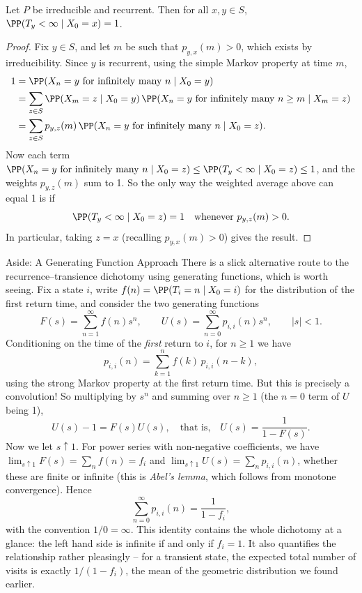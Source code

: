 \begin{theorem}
	Let $P$ be irreducible and recurrent. Then for all $x, y \in S$, $\PP(T_y < \infty \mid X_0 = x) = 1$.
\end{theorem}
\begin{proof}
	Fix $y \in S$, and let $m$ be such that $p_{y, x}(m) > 0$, which exists by irreducibility. Since $y$ is recurrent, using the simple Markov property at time $m$,
	\begin{align*}
		1 &= \PP(X_n = y \text{ for infinitely many } n \mid X_0 = y) \\
		&= \sum_{z \in S} \PP(X_m = z \mid X_0 = y) \, \PP(X_n = y \text{ for infinitely many } n \geq m \mid X_m = z) \\
		&= \sum_{z \in S} p_{y, z}(m) \, \PP(X_n = y \text{ for infinitely many } n \mid X_0 = z).
	\end{align*}
	Now each term $\PP(X_n = y \text{ for infinitely many } n \mid X_0 = z) \leq \PP(T_y < \infty \mid X_0 = z) \leq 1$, and the weights $p_{y, z}(m)$ sum to 1. So the only way the weighted average above can equal 1 is if
	$$
	\PP(T_y < \infty \mid X_0 = z) = 1 \quad \text{whenever } p_{y, z}(m) > 0.
	$$
	In particular, taking $z = x$ (recalling $p_{y,x}(m) > 0$) gives the result.
\end{proof}

\begin{aside}{Aside: A Generating Function Approach}
	There is a slick alternative route to the recurrence--transience dichotomy using generating functions, which is worth seeing. Fix a state $i$, write $f(n) = \PP(T_i = n \mid X_0 = i)$ for the distribution of the first return time, and consider the two generating functions
	$$
	F(s) = \sum_{n = 1}^{\infty} f(n)s^n, \qquad U(s) = \sum_{n = 0}^{\infty} p_{i, i}(n) s^n, \qquad |s| < 1.
	$$
	Conditioning on the time of the \emph{first} return to $i$, for $n \geq 1$ we have
	$$
	p_{i, i}(n) = \sum_{k = 1}^{n} f(k)\, p_{i, i}(n - k),
	$$
	using the strong Markov property at the first return time. But this is precisely a convolution! So multiplying by $s^n$ and summing over $n \geq 1$ (the $n = 0$ term of $U$ being 1),
	$$
	U(s) - 1 = F(s)U(s), \quad \text{that is,} \quad U(s) = \frac{1}{1 - F(s)}.
	$$
	Now we let $s \uparrow 1$. For power series with non-negative coefficients, we have $\lim_{s \uparrow 1} F(s) = \sum_n f(n) = f_i$ and $\lim_{s \uparrow 1} U(s) = \sum_n p_{i, i}(n)$, whether these are finite or infinite (this is \emph{Abel's lemma}, which follows from monotone convergence). Hence
	$$
	\sum_{n = 0}^{\infty} p_{i, i}(n) = \frac{1}{1 - f_i},
	$$
	with the convention $1/0 = \infty$. This identity contains the whole dichotomy at a glance: the left hand side is infinite if and only if $f_i = 1$. It also quantifies the relationship rather pleasingly -- for a transient state, the expected total number of visits is exactly $1/(1 - f_i)$, the mean of the geometric distribution we found earlier.

\end{aside}

